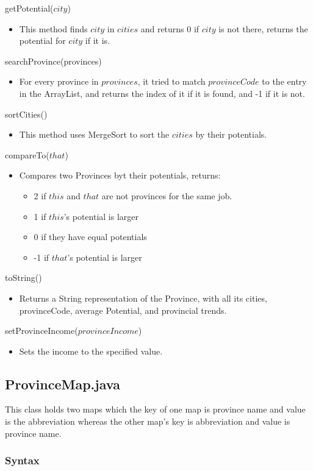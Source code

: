 \documentclass[12pt,fleqn]{article}
\begin{document}
\noindent getPotential($city$)
\begin{itemize}
\item This method finds $city$ in $cities$ and returns 0 if $city$ is not there, returns the potential for $city$ if it is.
\end{itemize}
\noindent searchProvince(provinces)
\begin{itemize}
\item For every province in $provinces$, it tried to match $provinceCode$ to the entry in the ArrayList, and returns the index of it if it is found, and -1 if it is not.
\end{itemize}
\noindent sortCities()
\begin{itemize}
\item This method uses MergeSort to sort the $cities$ by their potentials.
\end{itemize}
\noindent compareTo($that$)
\begin{itemize}
\item Compares two Provinces byt their potentials, returns:
\begin{itemize}
\item 2 if $this$ and $that$ are not provinces for the same job.
\item 1 if $this$'s potential is larger
\item 0 if they have equal potentials
\item -1 if $that$'s potential is larger
\end{itemize}
\end{itemize}
\noindent toString()
\begin{itemize}
\item Returns a String representation of the Province, with all its cities, provinceCode, average Potential, and provincial trends.
\end{itemize}
\noindent setProvinceIncome($provinceIncome$)
\begin{itemize}
\item Sets the income to the specified value.
\end{itemize}


\subsection*{ProvinceMap.java}\label{provmap}
This class holds two maps which the key of one map is province name and value is the abbreviation
whereas the other map’s key is abbreviation and value is province name.
\subsubsection* {Syntax}
\end{document}
